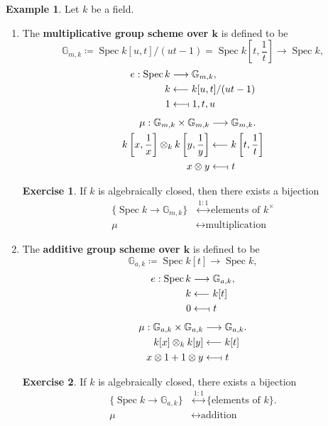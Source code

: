 \documentclass[12pt]{article}
\DeclareMathOperator{\Spec}{Spec}
\theoremstyle{definition}
\newtheorem*{exercise}{Exercise}
\newtheorem*{example}{Example}
\theoremstyle{remark}
\begin{document}
\begin{example}
Let $k$ be a field.

\begin{enumerate}[label=\arabic*)]
\item The \textbf{multiplicative group scheme over $\boldsymbol{k}$} is defined to be
\[\mathbb{G}_{m,k}\coloneqq\Spec k[u,t]/(ut-1)=\Spec k\left[t,\frac{1}{t}\right]\longrightarrow\Spec k,\]
\begin{align*}
e:\Spec k&\longrightarrow\mathbb{G}_{m,k},\\
k&\longleftarrow k[u,t]/(ut-1)\\
1&\longleftarrow\!\shortmid1,t,u
\end{align*}
\begin{align*}
\mu:\mathbb{G}_{m,k}\times\mathbb{G}_{m,k}&\longrightarrow\mathbb{G}_{m,k}.\\
k\left[x,\frac{1}{x}\right]\otimes_k k\left[y,\frac{1}{y}\right]&\longleftarrow k\left[t,\frac{1}{t}\right]\\
x\otimes y&\longleftarrow\!\shortmid t
\end{align*}

\begin{exercise}
If $k$ is algebraically closed, then there exists a bijection
\begin{align*}
\{\Spec k\rightarrow\mathbb{G}_{m,k}\}&\overset{1:1}{\longleftrightarrow}\text{elements of }k^{\times}\\
\mu&\longleftrightarrow\text{multiplication}
\end{align*}
\end{exercise}

\item The \textbf{additive group scheme over $\boldsymbol{k}$} is defined to be
\[\mathbb{G}_{a,k}\coloneqq\Spec k[t]\longrightarrow\Spec k,\]
\begin{align*}
e:\Spec k&\longrightarrow\mathbb{G}_{a,k},\\
k&\longleftarrow k[t]\\
0&\longleftarrow\!\shortmid t
\end{align*}
\begin{align*}
\mu:\mathbb{G}_{a,k}\times\mathbb{G}_{a,k}&\longrightarrow\mathbb{G}_{a,k}.\\
k[x]\otimes_kk[y]&\longleftarrow k[t]\\
x\otimes1+1\otimes y&\longleftarrow\!\shortmid t
\end{align*}

\begin{exercise}
If $k$ is algebraically closed, there exists a bijection
\begin{align*}
\{\Spec k\rightarrow\mathbb{G}_{a,k}\}&\overset{1:1}{\longleftrightarrow}\{\text{elements of }k\}.\\
\mu&\longleftrightarrow\text{addition}
\end{align*}
\end{exercise}


\end{enumerate}
\end{example}
\end{document}
